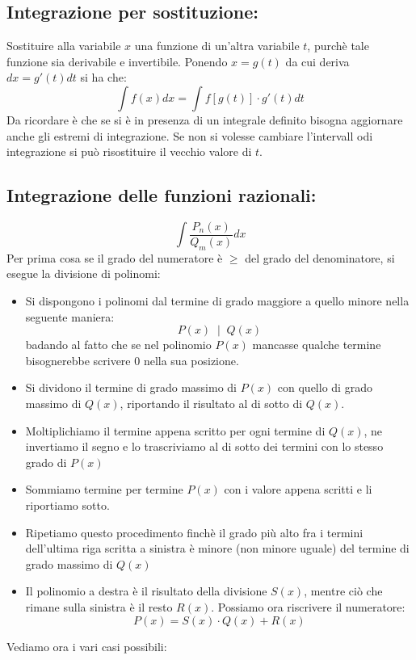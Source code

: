 \documentclass[a4paper, 9pt]{report}
\begin{document}
\subsection*{Integrazione per sostituzione:}
Sostituire alla variabile $x$ una funzione di un'altra variabile $t$, purchè tale funzione sia derivabile e invertibile.\newline
Ponendo $x = g(t)$ da cui deriva $dx = g'(t) dt$ si ha che:
\[
    \int f(x) dx = \int f[g(t)] \cdot g'(t) dt
\]
Da ricordare è che se si è in presenza di un integrale definito bisogna aggiornare anche gli estremi di integrazione. Se non si volesse cambiare l'intervall odi integrazione si può risostituire il vecchio valore di $t$.
\subsection*{Integrazione delle funzioni razionali:}
\[
    \int \frac{P_n(x)}{Q_m(x)} dx
\]
Per prima cosa se il grado del numeratore è $\geq$ del grado del denominatore, si esegue la divisione di polinomi:
\begin{itemize}
    \item Si dispongono i polinomi dal termine di grado maggiore a quello minore nella seguente maniera:
    \[
        P(x) \;\; | \;\; Q(x)    
    \]
    badando al fatto che se nel polinomio $P(x)$ mancasse qualche termine bisognerebbe scrivere $0$ nella sua posizione.
    \item Si dividono il termine di grado massimo di $P(x)$ con quello di grado massimo di $Q(x)$, riportando il risultato al di sotto di $Q(x)$.
    \item Moltiplichiamo il termine appena scritto per ogni termine di $Q(x)$, ne invertiamo il segno e lo trascriviamo al di sotto dei termini con lo stesso grado di $P(x)$
    \item Sommiamo termine per termine $P(x)$ con i valore appena scritti e li riportiamo sotto.
    \item Ripetiamo questo procedimento finchè il grado più alto fra i termini dell'ultima riga scritta a sinistra è minore (non minore uguale) del termine di grado massimo di $Q(x)$
    \item Il polinomio a destra è il risultato della divisione $S(x)$, mentre ciò che rimane sulla sinistra è il resto $R(x)$. Possiamo ora riscrivere il numeratore:
    \[
        P(x) = S(x) \cdot Q(x) + R(x)
    \]
\end{itemize}
Vediamo ora i vari casi possibili:
\end{document}
